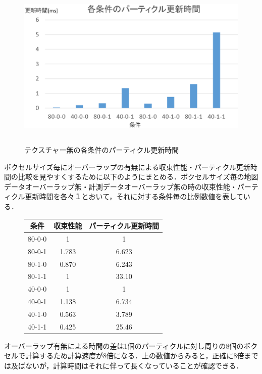 %
\begin{figure}[htbp]
  \begin{center}
   \includegraphics[height=80mm]{figure/各条件のパーティクル更新時間.eps}
   \caption{テクスチャー無の各条件のパーティクル更新時間}
   \label{各条件のパーティクル更新時間}
  \end{center}
\end{figure}
%

\newpage

ボクセルサイズ毎にオーバーラップの有無による収束性能・パーティクル更新時間の比較を見やすくするために以下のようにまとめる．ボクセルサイズ毎の地図データオーバーラップ無・計測データオーバーラップ無の時の収束性能・パーティクル更新時間を各々１とおいて，それに対する条件毎の比例数値を表している．

%
\begin{figure}[htbp]
\begin{center}
\begin{tabular}{ccc} \hline
条件 & 収束性能 &  パーティクル更新時間\\ \hline \hline
80-0-0 & 1 & 1\\ \hline
80-0-1 & 1.783 & 6.623\\ \hline
80-1-0 & 0.870 & 6.243\\ \hline
80-1-1 & 1 & 33.10\\ \hline \hline
40-0-0 & 1 & 1\\ \hline
40-0-1 & 1.138 & 6.734\\ \hline
40-1-0 & 0.563 & 3.789\\ \hline
40-1-1 & 0.425 & 25.46\\ \hline
\end{tabular}
\end{center}
\end{figure}
%
オーバーラップ有無による時間の差は1個のパーティクルに対し周りの8個のボクセルで計算するため計算速度が8倍になる．上の数値からみると，正確に8倍までは及ばないが，計算時間はそれに伴って長くなっていることが確認できる．

